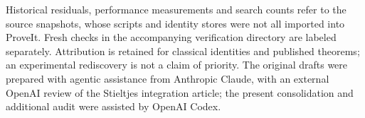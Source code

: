 Historical residuals, performance measurements and search counts refer to
the source snapshots, whose scripts and identity stores were not all imported
into ProveIt. Fresh checks in the accompanying verification directory are
labeled separately. Attribution is retained for classical identities and
published theorems; an experimental rediscovery is not a claim of priority.
The original drafts were prepared with agentic assistance from Anthropic
Claude, with an external OpenAI review of the Stieltjes integration article;
the present consolidation and additional audit were assisted by OpenAI Codex.

\tableofcontents
\mainmatter












\appendix

\backmatter


